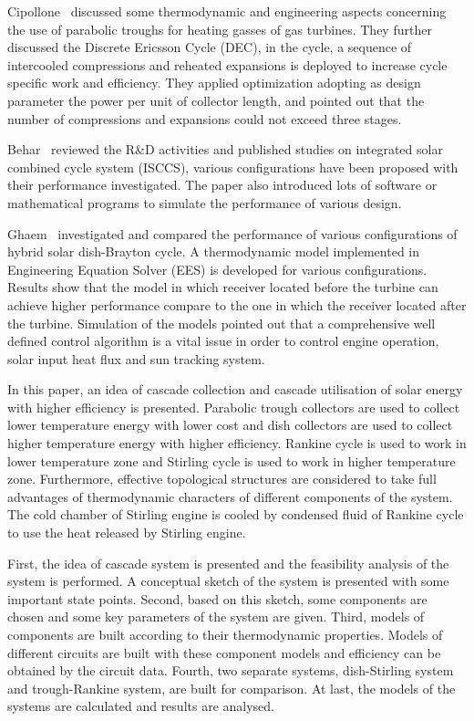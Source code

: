 \documentclass{article}
\begin{document}
Cipollone~\cite{Cipollone2014} discussed some thermodynamic and engineering aspects concerning the use of parabolic troughs for heating gasses of gas turbines. They further discussed the Discrete Ericsson Cycle (DEC), in the cycle, a sequence of intercooled compressions and reheated expansions is deployed to increase cycle specific work and efficiency. They applied optimization adopting as design parameter the power per unit of collector length, and pointed out that the number of compressions and expansions could not exceed three stages.

Behar~\cite{Behar2014} reviewed the R\&D activities and published studies on integrated solar combined cycle system (ISCCS), various configurations have been proposed with their performance investigated. The paper also introduced lots of software or mathematical programs to simulate the performance of various design.

Ghaem~\cite{Ghaem2012} investigated and compared the performance of various configurations of hybrid solar dish-Brayton cycle. A thermodynamic model implemented in Engineering Equation Solver (EES) is developed for various configurations. Results show that the model in which receiver located before the turbine can achieve higher performance compare to the one in which the receiver located after the turbine. Simulation of the models pointed out that a comprehensive well defined control algorithm is a vital issue in order to control engine operation, solar input heat flux and sun tracking system.

In this paper, an idea of cascade collection and cascade utilisation of solar energy with higher efficiency is presented. Parabolic trough collectors are used to collect lower temperature energy with lower cost and dish collectors are used to collect higher temperature energy with higher efficiency. Rankine cycle is used to work in lower temperature zone and Stirling cycle is used to work in higher temperature zone. Furthermore, effective topological structures are considered to take full advantages of thermodynamic characters of different components of the system. The cold chamber of Stirling engine is cooled by condensed fluid of Rankine cycle to use the heat released by Stirling engine. 

First, the idea of cascade system is presented and the feasibility analysis of the system is performed. A conceptual sketch of the system is presented with some important state points. Second, based on this sketch, some components are chosen and some key parameters of the system are given. Third, models of components are built according to their thermodynamic properties. Models of different circuits are built with these component models and efficiency can be obtained by the circuit data. Fourth, two separate systems, dish-Stirling system and trough-Rankine system, are built for comparison. At last, the models of the systems are calculated and results are analysed.
\end{document}
